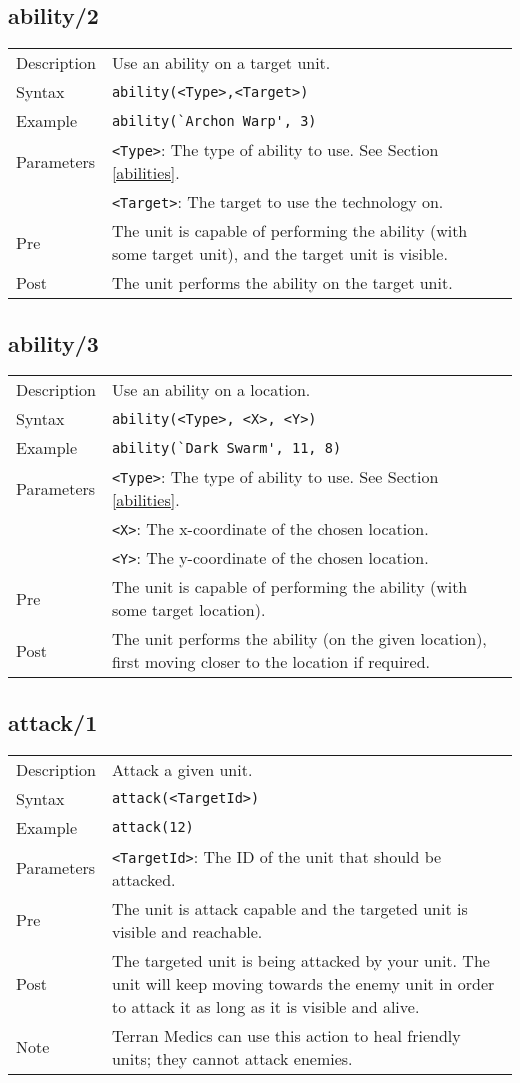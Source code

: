 \subsection{ability/2}
\begin{tabularx}{\textwidth}{lX}
 Description & Use an ability on a target unit. \\
 Syntax & \verb|ability(<Type>,<Target>)| \\
 Example & \verb|ability(`Archon Warp', 3)| \\
 Parameters & \verb|<Type>|: The type of ability to use. See Section \ref{abilities}. \\
            & \verb|<Target>|: The target to use the technology on.\\
 Pre & The unit is capable of performing the ability (with some target unit), and the target unit is visible. \\
 Post & The unit performs the ability on the target unit.
\end{tabularx}

\subsection{ability/3}
\begin{tabularx}{\textwidth}{lX}
 Description & Use an ability on a location. \\
 Syntax & \verb|ability(<Type>, <X>, <Y>)| \\
 Example & \verb|ability(`Dark Swarm', 11, 8)| \\
 Parameters & \verb|<Type>|: The type of ability to use. See Section \ref{abilities}. \\
            & \verb|<X>|: The x-coordinate of the chosen location. \\
            & \verb|<Y>|: The y-coordinate of the chosen location. \\
 Pre & The unit is capable of performing the ability (with some target location).  \\
 Post & The unit performs the ability (on the given location), first moving closer to the location if required.
\end{tabularx}

\subsection{attack/1}
\begin{tabularx}{\textwidth}{lX}
 Description & Attack a given unit. \\
 Syntax & \verb|attack(<TargetId>)| \\
 Example & \verb|attack(12)| \\
 Parameters & \verb|<TargetId>|: The ID of the unit that should be attacked. \\
 Pre & The unit is attack capable and the targeted unit is visible and reachable. \\
 Post & The targeted unit is being attacked by your unit. The unit will keep moving towards the enemy unit in order to attack it as long as it is visible and alive. \\
 Note & Terran Medics can use this action to heal friendly units; they cannot attack enemies.
\end{tabularx}

